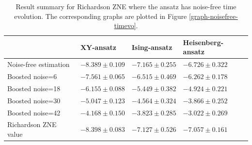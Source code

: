 \begin{table}[h]
\caption{Result summary for Richardson ZNE where the ansatz has noise-free time evolution. The corresponding graphs are plotted in Figure \ref{graph-noisefree-timevo}.}
\begin{tabular}{@{}llll@{}}
\toprule
  & XY-ansatz  & Ising-ansatz  & Heisenberg-ansatz\\
\midrule
Noise-free estimation & $-8.389 \pm 0.109$ & $-7.165 \pm 0.255$ & $-6.726 \pm 0.322$ \\
\midrule
Boosted noise=6 & $-7.561 \pm 0.065$ & $-6.515 \pm 0.469$ & $-6.262 \pm 0.178$ \\
Boosted noise=18 & $-6.155 \pm 0.088$ & $-5.449 \pm 0.382$ & $-4.924 \pm 0.221$ \\
Boosted noise=30 & $-5.047 \pm 0.123$ & $-4.564 \pm 0.324$ & $-3.866 \pm 0.252$ \\
Boosted noise=42 & $-4.168 \pm 0.150$ & $-3.823 \pm 0.285$ & $-3.022 \pm 0.269$ \\
\midrule
Richardson ZNE value & $-8.398 \pm 0.083$ & $-7.127 \pm 0.526$ & $-7.057 \pm 0.161$ \\
\bottomrule
\end{tabular}
\label{table-noisefree-timeevo-richardson}
\end{table}
